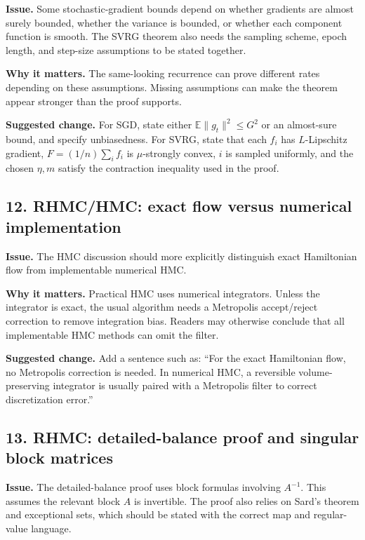 \documentclass[11pt]{article}
\begin{document}
\textbf{Issue.}  Some stochastic-gradient bounds depend on whether gradients are almost surely bounded, whether the variance is bounded, or whether each component function is smooth.  The SVRG theorem also needs the sampling scheme, epoch length, and step-size assumptions to be stated together.

\textbf{Why it matters.}  The same-looking recurrence can prove different rates depending on these assumptions.  Missing assumptions can make the theorem appear stronger than the proof supports.

\textbf{Suggested change.}  For SGD, state either \(\mathbb E\|g_t\|^2\le G^2\) or an almost-sure bound, and specify unbiasedness.  For SVRG, state that each \(f_i\) has \(L\)-Lipschitz gradient, \(F=(1/n)\sum_i f_i\) is \(\mu\)-strongly convex, \(i\) is sampled uniformly, and the chosen \(\eta,m\) satisfy the contraction inequality used in the proof.

\subsection*{12. RHMC/HMC: exact flow versus numerical implementation}

\textbf{Issue.}  The HMC discussion should more explicitly distinguish exact Hamiltonian flow from implementable numerical HMC.

\textbf{Why it matters.}  Practical HMC uses numerical integrators.  Unless the integrator is exact, the usual algorithm needs a Metropolis accept/reject correction to remove integration bias.  Readers may otherwise conclude that all implementable HMC methods can omit the filter.

\textbf{Suggested change.}  Add a sentence such as: ``For the exact Hamiltonian flow, no Metropolis correction is needed.  In numerical HMC, a reversible volume-preserving integrator is usually paired with a Metropolis filter to correct discretization error.''

\subsection*{13. RHMC: detailed-balance proof and singular block matrices}

\textbf{Issue.}  The detailed-balance proof uses block formulas involving \(A^{-1}\).  This assumes the relevant block \(A\) is invertible.  The proof also relies on Sard's theorem and exceptional sets, which should be stated with the correct map and regular-value language.
\end{document}

